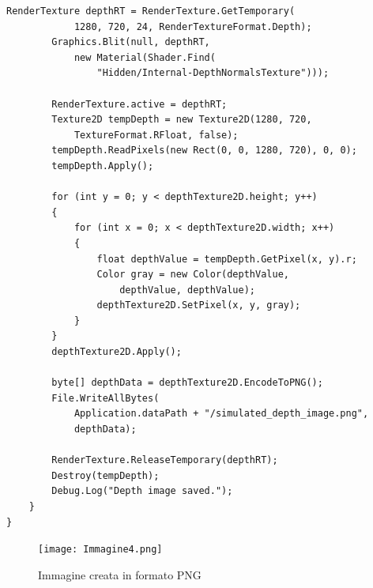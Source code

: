 \documentclass[11pt]{report}
\begin{document}
\begin{lstlisting}[caption=Script base di acquisizione immagini, label=lst:base, lineskip=0.3em]
        RenderTexture depthRT = RenderTexture.GetTemporary(
            1280, 720, 24, RenderTextureFormat.Depth);
        Graphics.Blit(null, depthRT, 
            new Material(Shader.Find(
                "Hidden/Internal-DepthNormalsTexture")));
        
        RenderTexture.active = depthRT;
        Texture2D tempDepth = new Texture2D(1280, 720, 
            TextureFormat.RFloat, false);
        tempDepth.ReadPixels(new Rect(0, 0, 1280, 720), 0, 0);
        tempDepth.Apply();

        for (int y = 0; y < depthTexture2D.height; y++)
        {
            for (int x = 0; x < depthTexture2D.width; x++)
            {
                float depthValue = tempDepth.GetPixel(x, y).r;
                Color gray = new Color(depthValue, 
                    depthValue, depthValue);
                depthTexture2D.SetPixel(x, y, gray);
            }
        }
        depthTexture2D.Apply();

        byte[] depthData = depthTexture2D.EncodeToPNG();
        File.WriteAllBytes(
            Application.dataPath + "/simulated_depth_image.png", 
            depthData);

        RenderTexture.ReleaseTemporary(depthRT);
        Destroy(tempDepth);
        Debug.Log("Depth image saved.");
    }
}
\end{lstlisting}

\begin{figure}[H]
    \centering
    \texttt{[image: Immagine4.png]}
    \caption{Immagine creata in formato PNG}
    \label{fig:output_image}
\end{figure}
\end{document}
